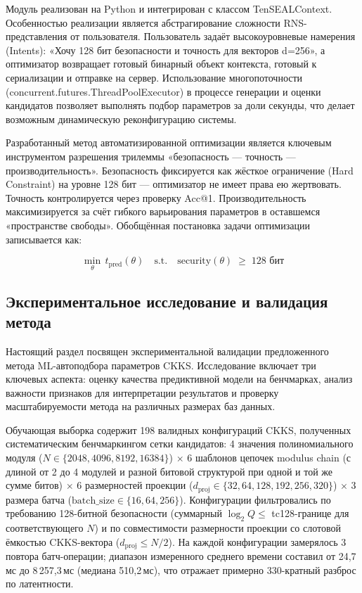 \documentclass[a4paper, 12pt, oneside, openany]{article}
\begin{document}
Модуль реализован на Python и интегрирован с классом TenSEALContext. Особенностью реализации является абстрагирование сложности RNS-представления от пользователя. Пользователь задаёт высокоуровневые намерения (Intents): «Хочу 128 бит безопасности и точность для векторов d=256», а оптимизатор возвращает готовый бинарный объект контекста, готовый к сериализации и отправке на сервер. Использование многопоточности (concurrent.futures.ThreadPoolExecutor) в процессе генерации и оценки кандидатов позволяет выполнять подбор параметров за доли секунды, что делает возможным динамическую реконфигурацию системы.

Разработанный метод автоматизированной оптимизации является ключевым инструментом разрешения трилеммы «безопасность --- точность --- производительность». Безопасность фиксируется как жёсткое ограничение (Hard Constraint) на уровне 128 бит --- оптимизатор не имеет права ею жертвовать. Точность контролируется через проверку Acc@1. Производительность максимизируется за счёт гибкого варьирования параметров в оставшемся «пространстве свободы». Обобщённая постановка задачи оптимизации записывается как:

\begin{equation}
	\min_{\theta}\, t_{\mathrm{pred}}(\theta) \quad \text{s.t.} \quad \mathrm{security}(\theta) \;\geq\; 128 \text{ бит}
	\label{eq:3-11}
\end{equation}


\subsection{Экспериментальное исследование и валидация метода}

Настоящий раздел посвящен экспериментальной валидации предложенного метода ML-автоподбора параметров CKKS. Исследование включает три ключевых аспекта: оценку качества предиктивной модели на бенчмарках, анализ важности признаков для интерпретации результатов и проверку масштабируемости метода на различных размерах баз данных.

Обучающая выборка содержит 198 валидных конфигураций CKKS, полученных систематическим бенчмаркингом сетки кандидатов: 4 значения полиномиального модуля ($N \in \{2048, 4096, 8192, 16384\}$) $\times$ 6 шаблонов цепочек modulus chain (с длиной от 2 до 4 модулей и разной битовой структурой при одной и той же сумме битов) $\times$ 6 размерностей проекции ($d_{\text{proj}} \in \{32, 64, 128, 192, 256, 320\}$) $\times$ 3 размера батча ($\mathrm{batch\_size} \in \{16, 64, 256\}$). Конфигурации фильтровались по требованию 128-битной безопасности (суммарный $\log_2 Q \leq$ tc128-границе для соответствующего $N$) и по совместимости размерности проекции со слотовой ёмкостью CKKS-вектора ($d_{\text{proj}} \leq N/2$). На каждой конфигурации замерялось 3 повтора батч-операции; диапазон измеренного среднего времени составил от 24,7\,мс до 8\,257,3\,мс (медиана 510,2\,мс), что отражает примерно 330-кратный разброс по латентности.
\end{document}
